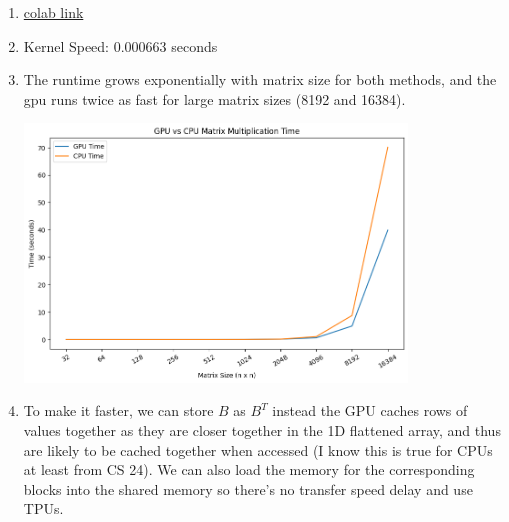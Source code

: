 \begin{solution*}{}{}
\begin{enumerate}
    \item \href{https://colab.research.google.com/drive/10ih_KraR17stg4llNfxWk82pU-lto32N?usp=sharing}{colab link}
\item Kernel Speed: 0.000663 seconds
\item The runtime grows exponentially with matrix size for both methods, and the
    gpu runs twice as fast for large matrix sizes (8192 and 16384).
\begin{center}
\includegraphics[width=0.8\textwidth]{media/5.png}
\end{center}
\item To make it faster, we can store $B$ as $B^{T}$ instead the GPU caches rows
    of values together as they are closer together in the 1D flattened array,
    and thus are likely to be cached together when accessed (I know this is true
    for CPUs at least from CS 24). We can also load the memory for the
    corresponding blocks into the shared memory so there's no transfer speed
    delay and use TPUs.
\end{enumerate}
\end{solution*}
